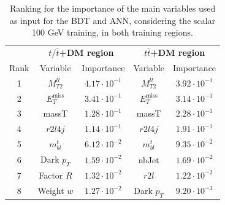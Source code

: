 \documentclass[a4paper, 10pt, openright]{report}
\begin{document}
\begin{table}
\begin{center}
\begin{tabular}{ c|c|c|c|c } 
 \hline
 & \multicolumn{2}{c}{\textbf{$t/\bar t$+DM region}} & \multicolumn{2}{c}{\textbf{$t \bar t$+DM region}} \\
 Rank & Variable & Importance & Variable & Importance \\
 \hline
 1 & $M_{T2}^{ll}$ & $4.17 \cdot 10^{-1}$ & $M_{T2}^{ll}$ & $3.92 \cdot 10^{-1}$ \\
 2 & $E_{T}^{\text{miss}}$ & $3.41 \cdot 10^{-1}$ & $E_{T}^{\text{miss}}$ & $3.14 \cdot 10^{-1}$ \\
 3 & massT & $1.28 \cdot 10^{-1}$ & massT & $2.28 \cdot 10^{-1}$ \\ 
 4 & $r2l4j$ & $1.14 \cdot 10^{-1}$ & $r2l4j$ & $1.91 \cdot 10^{-1}$ \\ 
 5 & $m_{bl}^t$ & $6.12 \cdot 10^{-2}$ & $m_{bl}^t$ & $9.35 \cdot 10^{-2}$ \\
 6 & Dark $p_T$ & $1.59 \cdot 10^{-2}$ & nbJet & $1.69 \cdot 10^{-2}$ \\
 7 & Factor $R$ & $1.32 \cdot 10^{-2}$ & $r2l$ & $1.22 \cdot 10^{-2}$ \\
 8 & Weight $w$ & $1.27 \cdot 10^{-2}$ & Dark $p_T$ & $9.20 \cdot 10^{-3}$ \\
\hline
\end{tabular}
\caption{Ranking for the importance of the main variables used as input for the \ac{BDT} and \ac{ANN}, considering the scalar 100 GeV training, in both training regions.}
\label{table:importance1}
\end{center}
\end{table}
\end{document}
